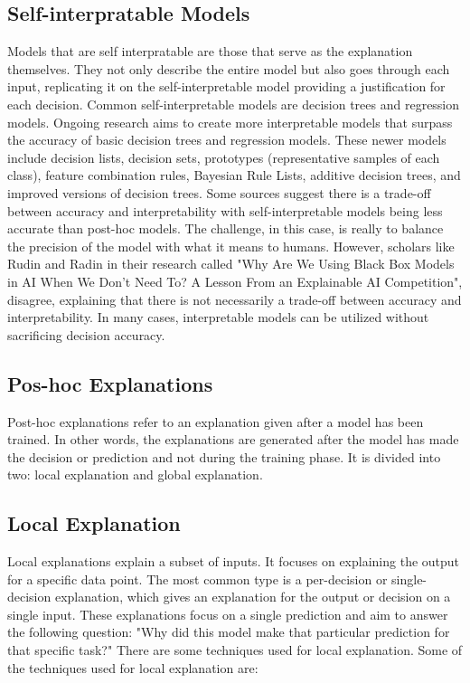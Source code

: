 \documentclass[10pt,journal,compsoc]{IEEEtran}
\begin{document}
\subsection{Self-interpratable Models}
Models that are self interpratable are those that serve as the explanation themselves. They not only describe the entire model but also goes through each input, replicating it on the self-interpretable model providing a justification for each decision.
Common self-interpretable models are decision trees and regression models. Ongoing research aims to create more interpretable models that surpass the accuracy of basic decision trees and regression models. These newer models include decision lists, decision sets, prototypes (representative samples of each class), feature combination rules, Bayesian Rule Lists, additive decision trees, and improved versions of decision trees.\cite{phillips2020four}
Some sources suggest there is a trade-off between accuracy and interpretability with self-interpretable models being less accurate than post-hoc models. The challenge, in this case, is really to balance the precision of the model with what it means to humans. However, scholars like Rudin\cite{rudin} and Radin\cite{radin} in their research called "Why Are We Using Black Box Models in AI When We Don’t Need To? A Lesson From an Explainable AI Competition", disagree, explaining that there is not necessarily a trade-off between accuracy and interpretability. In many cases, interpretable models can be utilized without sacrificing decision accuracy.\cite{phillips2020four}

\subsection{Pos-hoc Explanations}
Post-hoc explanations refer to an explanation given after a model has been trained. In other words, the explanations are generated after the model has made the decision or prediction and not during the training phase. It is divided into two: local explanation and global explanation.

\subsection{Local Explanation} Local explanations explain a subset of inputs. It focuses on explaining the output for a specific data point. The most common type is a per-decision or single-decision explanation, which gives an explanation for the output or decision on a single input.\cite{phillips2020four}
These explanations focus on a single prediction and aim to answer the following question: "Why did this model make that particular prediction for that specific task?" There are some techniques used for local explanation. Some of the techniques used for local explanation are:
\end{document}
